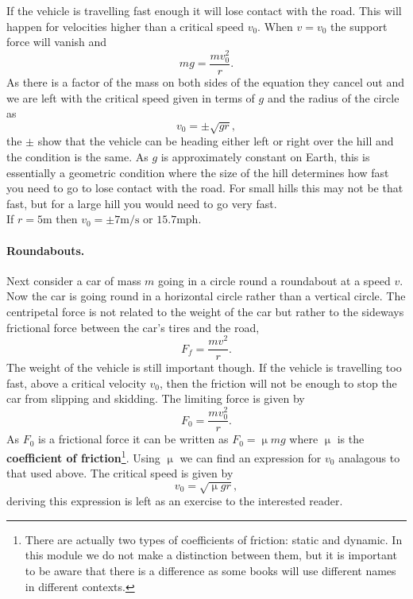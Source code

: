 \documentclass[a4paper,12pt]{book}
\begin{document}
If the vehicle is travelling fast enough it will lose contact with the road. This will happen for velocities higher than a critical speed $v_{0}$. When $v=v_{0}$ the support force will vanish and
\begin{equation*}
mg=\frac{mv^{2}_{0}}{r}.
\end{equation*}
As there is a factor of the mass on both sides of the equation they cancel out and we are left with the critical speed given in terms of $g$ and the radius of the circle as
\begin{equation*}
v_{0}=\pm\sqrt{gr},
\end{equation*}
the $\pm$ show that the vehicle can be heading either left or right over the hill and the condition is the same. As $g$ is approximately constant on Earth, this is essentially a geometric condition where the size of the hill determines how fast you need to go to lose contact with the road. For small hills this may not be that fast, but for a large hill you would need to go very fast.\\

If $r=5\text{m}$ then $v_{0}=\pm 7\text{m/s}$ or $15.7\text{mph}$.

\paragraph{Roundabouts.} Next consider a car of mass $m$ going in a circle round a roundabout at a speed $v$. Now the car is going round in a horizontal circle rather than a vertical circle. The centripetal force is not related to the weight of the car but rather to the sideways frictional force between the car's tires and the road,
\begin{equation*}
F_{f}=\frac{mv^{2}}{r}.
\end{equation*}
The weight of the vehicle is still important though. If the vehicle is travelling too fast, above a critical velocity $v_{0}$, then the friction will not be enough to stop the car from slipping and skidding. The limiting force is given by
\begin{equation*}
F_{0}=\frac{mv_{0}^{2}}{r}.
\end{equation*}
As $F_{0}$ is a frictional force it can be written as $F_{0}=\upmu mg$ where $\upmu$ is the \textbf{coefficient of friction}\footnote{There are actually two types of coefficients of friction: static and dynamic. In this module we do not make a distinction between them, but it is important to be aware that there is a difference as some books will use different names in different contexts.}.  Using $\upmu$ we can find an expression for $v_{0}$ analagous to that used above. The critical speed is given by
\begin{equation*}
v_{0}=\sqrt{\upmu g r},
\end{equation*}
deriving this expression is left as an exercise to the interested reader.
\end{document}
